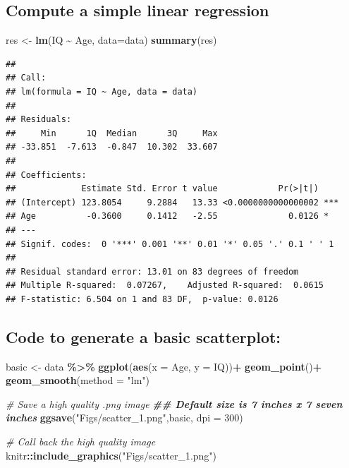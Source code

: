 \documentclass[
]{book}
\newenvironment{Shaded}{\begin{snugshade}}{\end{snugshade}}
\newcommand{\AttributeTok}[1]{\textcolor[rgb]{0.13,0.29,0.53}{#1}}
\newcommand{\CommentTok}[1]{\textcolor[rgb]{0.56,0.35,0.01}{\textit{#1}}}
\newcommand{\DecValTok}[1]{\textcolor[rgb]{0.00,0.00,0.81}{#1}}
\newcommand{\DocumentationTok}[1]{\textcolor[rgb]{0.56,0.35,0.01}{\textbf{\textit{#1}}}}
\newcommand{\FunctionTok}[1]{\textcolor[rgb]{0.13,0.29,0.53}{\textbf{#1}}}
\newcommand{\NormalTok}[1]{#1}
\newcommand{\OtherTok}[1]{\textcolor[rgb]{0.56,0.35,0.01}{#1}}
\newcommand{\SpecialCharTok}[1]{\textcolor[rgb]{0.81,0.36,0.00}{\textbf{#1}}}
\newcommand{\StringTok}[1]{\textcolor[rgb]{0.31,0.60,0.02}{#1}}
\begin{document}
\subsection*{Compute a simple linear regression}\label{compute-a-simple-linear-regression}

\begin{Shaded}
\begin{Highlighting}[]
\NormalTok{res }\OtherTok{\textless{}{-}} \FunctionTok{lm}\NormalTok{(IQ }\SpecialCharTok{\textasciitilde{}}\NormalTok{ Age, }\AttributeTok{data=}\NormalTok{data)}
\FunctionTok{summary}\NormalTok{(res)}
\end{Highlighting}
\end{Shaded}

\begin{verbatim}
## 
## Call:
## lm(formula = IQ ~ Age, data = data)
## 
## Residuals:
##     Min      1Q  Median      3Q     Max 
## -33.851  -7.613  -0.847  10.302  33.607 
## 
## Coefficients:
##             Estimate Std. Error t value            Pr(>|t|)    
## (Intercept) 123.8054     9.2884   13.33 <0.0000000000000002 ***
## Age          -0.3600     0.1412   -2.55              0.0126 *  
## ---
## Signif. codes:  0 '***' 0.001 '**' 0.01 '*' 0.05 '.' 0.1 ' ' 1
## 
## Residual standard error: 13.01 on 83 degrees of freedom
## Multiple R-squared:  0.07267,    Adjusted R-squared:  0.0615 
## F-statistic: 6.504 on 1 and 83 DF,  p-value: 0.0126
\end{verbatim}

\subsection*{Code to generate a basic scatterplot:}\label{code-to-generate-a-basic-scatterplot}

\begin{Shaded}
\begin{Highlighting}[]
\NormalTok{basic }\OtherTok{\textless{}{-}}\NormalTok{ data }\SpecialCharTok{\%\textgreater{}\%}
  \FunctionTok{ggplot}\NormalTok{(}\FunctionTok{aes}\NormalTok{(}\AttributeTok{x =}\NormalTok{ Age, }\AttributeTok{y =}\NormalTok{ IQ))}\SpecialCharTok{+}
  \FunctionTok{geom\_point}\NormalTok{()}\SpecialCharTok{+}
  \FunctionTok{geom\_smooth}\NormalTok{(}\AttributeTok{method =} \StringTok{"lm"}\NormalTok{)}

\CommentTok{\# Save a high quality .png image}
\DocumentationTok{\#\# Default size is 7 inches x 7 seven inches}
\FunctionTok{ggsave}\NormalTok{(}\StringTok{"Figs/scatter\_1.png"}\NormalTok{,basic, }\AttributeTok{dpi =} \DecValTok{300}\NormalTok{)}

\CommentTok{\# Call back the high quality image }
\NormalTok{knitr}\SpecialCharTok{::}\FunctionTok{include\_graphics}\NormalTok{(}\StringTok{"Figs/scatter\_1.png"}\NormalTok{)}
\end{Highlighting}
\end{Shaded}
\end{document}
